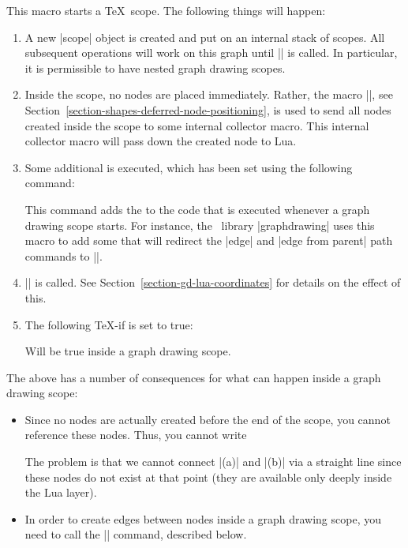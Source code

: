 \begin{command}{\pgfgdbeginscope}
  This macro starts a \TeX\ scope. The following things will happen:
  \begin{enumerate}
  \item A new |scope| object is created and put on an internal stack
    of scopes. All subsequent operations will work on this graph until
    |\pgfgdendscope| is called. In particular, it is permissible to
    have nested graph drawing scopes.
  \item Inside the scope, no nodes are placed immediately. Rather, 
    the macro |\pgfpositionnodelater|, see
    Section~\ref{section-shapes-deferred-node-positioning}, is used to
    send all nodes created inside the scope to some internal collector
    macro. This internal collector macro will pass down the created
    node to Lua.
  \item Some additional  is executed, which has been set
    using the following command:
    \begin{command}{\pgfgdaddspecificationhook{}}
      This command adds the  to the code that is executed
      whenever a graph drawing scope starts. For instance, the
      \tikzname\ library |graphdrawing| uses this macro to add some
       that will redirect the |edge| and |edge from parent|
      path commands to |\pgfgdedge|.
    \end{command}
  \item |\pgftransformreset| is called. See
    Section~\ref{section-gd-lua-coordinates} for details on the effect
    of this.
  \item The following \TeX-if is set to true:
    {
      \let\ifpgfgdgraphdrawingscopeactive=\relax
      \begin{textoken}{\ifpgfgdgraphdrawingscopeactive}
        Will be true inside a graph drawing scope.
      \end{textoken}
    }
  \end{enumerate}
  The above has a number of consequences for what can happen inside a
  graph drawing scope:
  \begin{itemize}
  \item Since no nodes are actually created before the end of the
    scope, you cannot reference these nodes. Thus, you cannot write
\begin{codeexample}
\end{codeexample}
    The problem is that we cannot connect |(a)| and |(b)| via a
    straight line since these nodes do not exist at that point (they
    are available only deeply inside the Lua layer).
  \item In order to create edges between nodes inside a graph drawing
    scope, you need to call the |\pgfgdedge| command, described below.
  \end{itemize}
\end{command}


